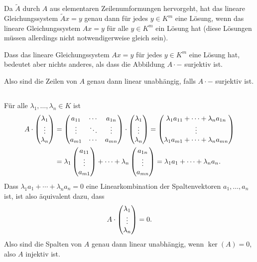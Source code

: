\documentclass[a4paper,10pt]{scrartcl}
\begin{document}
Da $\tilde{A}$ durch $A$ aus elementaren Zeilenumformungen hervorgeht, hat das lineare Gleichungssystem $\tilde{A}x = y$ genau dann für jedes $y \in K^m$ eine Lösung, wenn das lineare Gleichungssystem $Ax = y$ für alle $y \in K^m$ ein Lösung hat (diese Lösungen müssen allerdings nicht notwendigerweise gleich sein).

Dass das lineare Gleichungssystem $Ax = y$ für jedes $y \in K^m$ eine Lösung hat, bedeutet aber nichts anderes, als dass die Abbildung $A \cdot -$ surjektiv ist.

Also sind die Zeilen von $A$ genau dann linear unabhängig, falls $A \cdot -$ surjektiv ist.



\subsection{}
Für alle $\lambda_1, \dotsc, \lambda_n \in K$ ist
\begin{align*}
 A \cdot \begin{pmatrix} \lambda_1 \\ \vdots \\ \lambda_n \end{pmatrix}
 &=
 \begin{pmatrix}
  a_{11} & \cdots & a_{1n} \\
  \vdots & \ddots & \vdots \\
  a_{m1} & \cdots & a_{mn}
 \end{pmatrix}
 \cdot
 \begin{pmatrix} \lambda_1 \\ \vdots \\ \lambda_n \end{pmatrix}
 =
 \begin{pmatrix} \lambda_1 a_{11} + \dotsb + \lambda_n a_{1n} \\ \vdots \\ \lambda_1 a_{m1} + \dotsb + \lambda_n a_{mn} \end{pmatrix} \\
 &= \lambda_1 \begin{pmatrix} a_{11} \\ \vdots \\ a_{m1} \end{pmatrix} + \dotsb + \lambda_n \begin{pmatrix} a_{1n} \\ \vdots \\ a_{mn} \end{pmatrix}
 = \lambda_1 a_1 + \dotsb + \lambda_n a_n.
\end{align*}
Dass $\lambda_1 a_1 + \dotsb + \lambda_n a_n = 0$ eine Linearkombination der Spaltenvektoren $a_1, \dotsc, a_n$ ist, ist also äquivalent dazu, dass
\[
 A \cdot \begin{pmatrix} \lambda_1 \\ \vdots \\ \lambda_n \end{pmatrix} = 0.
\]
Also sind die Spalten von $A$ genau dann linear unabhängig, wenn $\ker(A) = 0$, also $A$ injektiv ist.
\end{document}
